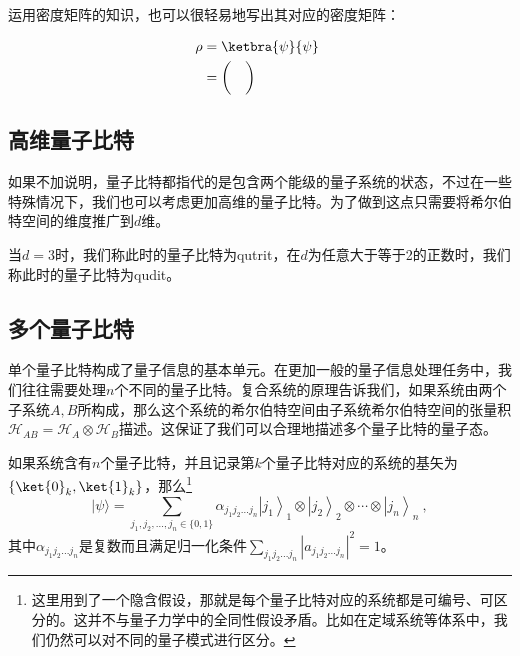 运用密度矩阵的知识，也可以很轻易地写出其对应的密度矩阵：

\begin{equation}
\begin{aligned}
\rho &= \ketbra{\psi}{\psi} \\
&=  \begin{pmatrix}
     &  \\
     &  \\
    \end{pmatrix}
\end{aligned}~
\end{equation}









\subsection{高维量子比特}

如果不加说明，量子比特都指代的是包含两个能级的量子系统的状态，不过在一些特殊情况下，我们也可以考虑更加高维的量子比特。为了做到这点只需要将希尔伯特空间的维度推广到$d$维。

当$d=3$时，我们称此时的量子比特为qutrit，在$d$为任意大于等于2的正数时，我们称此时的量子比特为qudit。

\subsection{多个量子比特}


单个量子比特构成了量子信息的基本单元。在更加一般的量子信息处理任务中，我们往往需要处理$n$个不同的量子比特。复合系统的原理告诉我们，如果系统由两个子系统$A,B$所构成，那么这个系统的希尔伯特空间由子系统希尔伯特空间的张量积$\mathcal{H}_{AB}=\mathcal{H}_A\otimes\mathcal{H}_B$描述。这保证了我们可以合理地描述多个量子比特的量子态。

如果系统含有$n$个量子比特，并且记录第$k$个量子比特对应的系统的基矢为$\{\ket{0}_k,\ket{1}_k\}$，那么\footnote{这里用到了一个隐含假设，那就是每个量子比特对应的系统都是可编号、可区分的。这并不与量子力学中的全同性假设矛盾。比如在定域系统等体系中，我们仍然可以对不同的量子模式进行区分。}$$
|\psi\rangle=\sum_{j_1, j_2, \ldots, j_n \in\{0,1\}} \alpha_{j_1 j_2 \ldots j_n}\left|j_1\right\rangle_1 \otimes\left|j_2\right\rangle_2 \otimes \cdots \otimes\left|j_n\right\rangle_n~,
$$其中$\alpha_{j_1j_2\ldots j_n}$是复数而且满足归一化条件$\sum_{j_1j_2\ldots j_n}|a_{j_1j_2\ldots j_n}|^2=1$。

